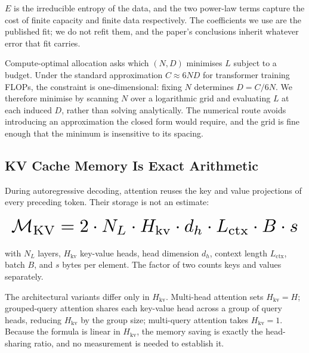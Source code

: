 \documentclass[10pt,journal,compsoc,twocolumn]{IEEEtran}
\begin{document}
$E$ is the irreducible entropy of the data, and the two power-law terms capture the cost of finite capacity and finite data respectively. The coefficients we use are the published fit; we do not refit them, and the paper's conclusions inherit whatever error that fit carries.

Compute-optimal allocation asks which $(N, D)$ minimises $L$ subject to a budget. Under the standard approximation $C \approx 6ND$ for transformer training FLOPs, the constraint is one-dimensional: fixing $N$ determines $D = C / 6N$. We therefore minimise by scanning $N$ over a logarithmic grid and evaluating $L$ at each induced $D$, rather than solving analytically. The numerical route avoids introducing an approximation the closed form would require, and the grid is fine enough that the minimum is insensitive to its spacing.


\subsection{KV Cache Memory Is Exact Arithmetic}


During autoregressive decoding, attention reuses the key and value projections of every preceding token. Their storage is not an estimate:










\begin{equation}
\resizebox{\columnwidth}{!}{$\displaystyle
\begin{aligned}
\mathcal{M}_{\text{KV}} = 2 \cdot N_L \cdot H_{\text{kv}} \cdot d_h \cdot L_{\text{ctx}} \cdot B \cdot s
\end{aligned}
$}
\end{equation}










with $N_L$ layers, $H_{\text{kv}}$ key-value heads, head dimension $d_h$, context length $L_{\text{ctx}}$, batch $B$, and $s$ bytes per element. The factor of two counts keys and values separately.

The architectural variants differ only in $H_{\text{kv}}$. Multi-head attention sets $H_{\text{kv}} = H$; grouped-query attention shares each key-value head across a group of query heads, reducing $H_{\text{kv}}$ by the group size; multi-query attention takes $H_{\text{kv}} = 1$. Because the formula is linear in $H_{\text{kv}}$, the memory saving is exactly the head-sharing ratio, and no measurement is needed to establish it.
\end{document}
